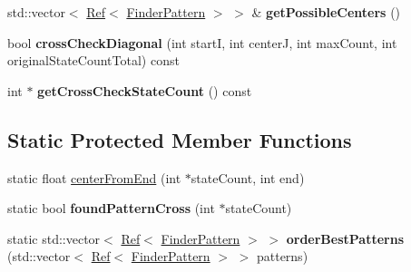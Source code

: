 \begin{DoxyCompactItemize}
\item 
\mbox{\label{classzxing_1_1qrcode_1_1_finder_pattern_finder_ab8d16cdc29e425ec587953fcbeb76714}} 
std\+::vector$<$ \mbox{\hyperlink{classzxing_1_1_ref}{Ref}}$<$ \mbox{\hyperlink{classzxing_1_1qrcode_1_1_finder_pattern}{Finder\+Pattern}} $>$ $>$ \& {\bfseries get\+Possible\+Centers} ()
\item 
\mbox{\label{classzxing_1_1qrcode_1_1_finder_pattern_finder_aa7808a752f2c762fce9b0bb792954b92}} 
bool {\bfseries cross\+Check\+Diagonal} (int startI, int centerJ, int max\+Count, int original\+State\+Count\+Total) const
\item 
\mbox{\label{classzxing_1_1qrcode_1_1_finder_pattern_finder_ae43188fb6587b6cb9d8462b12fb28253}} 
int $\ast$ {\bfseries get\+Cross\+Check\+State\+Count} () const
\end{DoxyCompactItemize}
\subsection*{Static Protected Member Functions}
\begin{DoxyCompactItemize}
\item 
static float \mbox{\hyperlink{classzxing_1_1qrcode_1_1_finder_pattern_finder_a37739136a32f627baa3720b998c2f58c}{center\+From\+End}} (int $\ast$state\+Count, int end)
\item 
\mbox{\label{classzxing_1_1qrcode_1_1_finder_pattern_finder_af86893dbc749f44808838e8b1dc0447c}} 
static bool {\bfseries found\+Pattern\+Cross} (int $\ast$state\+Count)
\item 
\mbox{\label{classzxing_1_1qrcode_1_1_finder_pattern_finder_a67125517720ee90397ba710a5111618c}} 
static std\+::vector$<$ \mbox{\hyperlink{classzxing_1_1_ref}{Ref}}$<$ \mbox{\hyperlink{classzxing_1_1qrcode_1_1_finder_pattern}{Finder\+Pattern}} $>$ $>$ {\bfseries order\+Best\+Patterns} (std\+::vector$<$ \mbox{\hyperlink{classzxing_1_1_ref}{Ref}}$<$ \mbox{\hyperlink{classzxing_1_1qrcode_1_1_finder_pattern}{Finder\+Pattern}} $>$ $>$ patterns)
\end{DoxyCompactItemize}
